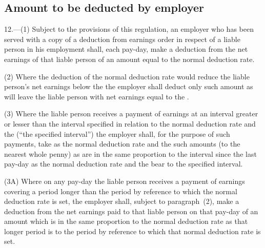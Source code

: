 \documentclass[12pt,a4paper]{article}
\begin{document}
\subsection[12. Amount to be deducted by employer]{Amount to be deducted by employer}

12.—(1) Subject to the provisions of this regulation, an employer who has been served with a copy of a deduction from earnings order in respect of a liable person in his employment shall, each pay-day, make a deduction from the net earnings of that liable person of an amount equal to the normal deduction rate.

(2) Where the deduction of the normal deduction rate would reduce the liable person’s net earnings below the 
the employer shall deduct only such amount as will leave the liable person with net earnings equal to the 
.  %

(3) Where the liable person receives a payment of earnings at an interval greater or lesser than the interval specified in relation to the normal deduction rate and the 
(“the specified interval”) the employer shall, for the purpose of such payments, take as the normal deduction rate and the  
such amounts (to the nearest whole penny) as are in the same proportion to the interval since the last pay-day as the normal deduction rate and the  
bear to the specified interval.

(3A) Where on any pay-day the liable person receives a payment of earnings covering a period longer than the period by reference to which the normal deduction rate is set, the employer shall, subject to paragraph~(2), make a deduction from the net earnings paid to that liable person on that pay-day of an amount which is in the same proportion to the normal deduction rate as that longer period is to the period by reference to which that normal deduction rate is set.
\end{document}
